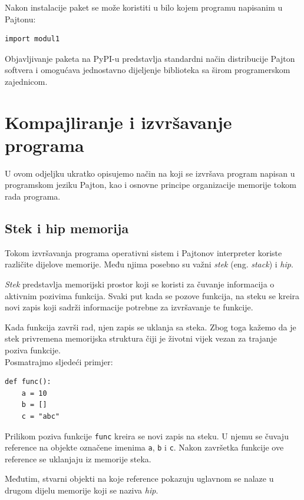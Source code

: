 Nakon instalacije paket se može koristiti u bilo kojem programu napisanim u Pajtonu:
\begin{verbatim}
import modul1
\end{verbatim}

Objavljivanje paketa na PyPI-u predstavlja standardni način distribucije Pajton softvera i omogućava jednostavno dijeljenje biblioteka sa širom programerskom zajednicom.

\section{Kompajliranje i izvršavanje programa}

U ovom odjeljku ukratko opisujemo način na koji se izvršava program napisan u programskom jeziku Pajton, kao i osnovne principe organizacije memorije tokom rada programa.

\subsection{Stek i hip memorija}

Tokom izvršavanja programa operativni sistem i Pajtonov interpreter koriste različite dijelove memorije. Među njima posebno su važni \textit{stek} (eng. \textit{stack}) i \textit{hip}.

\textit{Stek} predstavlja memorijski prostor koji se koristi za čuvanje informacija o aktivnim pozivima funkcija. Svaki put kada se pozove funkcija, na steku se kreira novi zapis koji sadrži informacije potrebne za izvršavanje te funkcije.

Kada funkcija završi rad, njen zapis se uklanja sa steka. Zbog toga kažemo da je stek privremena memorijska struktura čiji je životni vijek vezan za trajanje poziva funkcije.\\

Posmatrajmo sljedeći primjer:

\begin{verbatim}
def func():
    a = 10
    b = []
    c = "abc"
\end{verbatim}

Prilikom poziva funkcije \texttt{func} kreira se novi zapis na steku. U njemu se čuvaju reference na objekte označene imenima \texttt{a}, \texttt{b} i \texttt{c}. Nakon završetka funkcije ove reference se uklanjaju iz memorije steka.

Međutim, stvarni objekti na koje reference pokazuju uglavnom se nalaze u drugom dijelu memorije koji se naziva \textit{hip}.

